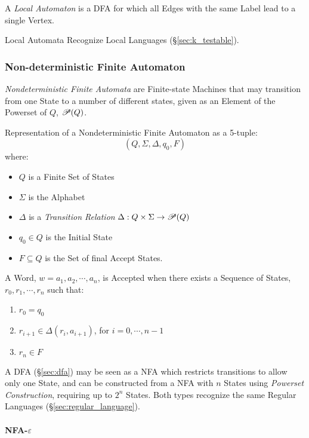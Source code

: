 A \emph{Local Automaton} is a DFA for which all Edges with the same
Label lead to a single Vertex.

Local Automata Recognize Local Languages (\S\ref{sec:k_testable}).



\subsubsection{Non-deterministic Finite Automaton}\label{sec:ndfa}

\emph{Nondeterministic Finite Automata} are Finite-state Machines that
may transition from one State to a number of different states, given
as an Element of the Powerset of $Q$, $\mathscr{P}(Q)$.

Representation of a Nondeterministic Finite Automaton as a
5-tuple:
\[
  (Q,\Sigma,\Delta,q_0,F)
\]
where:
\begin{itemize}
  \item $Q$ is a Finite Set of States
  \item $\Sigma$ is the Alphabet
  \item $\Delta$ is a \emph{Transition Relation} $\Delta: Q \times
    \Sigma \rightarrow \mathscr{P}(Q)$
  \item $q_0 \in Q$ is the Initial State
  \item $F \subseteq Q$ is the Set of final Accept States.
\end{itemize}

A Word, $w=a_1,a_2,\cdots,a_n$, is Accepted when there exists a
Sequence of States, $r_0,r_1,\cdots,r_n$ such that:
\begin{enumerate}
  \item $r_0 = q_0$
  \item $r_{i+1} \in \Delta(r_i, a_{i+1})$, for $i = 0, \cdots, n-1$
  \item $r_n \in F$
\end{enumerate}

A DFA (\S\ref{sec:dfa}) may be seen as a NFA which restricts
transitions to allow only one State, and can be constructed from a NFA
with $n$ States using \emph{Powerset Construction}, requiring up to
$2^n$ States. Both types recognize the same Regular Languages
(\S\ref{sec:regular_language}).



\paragraph{NFA-$\varepsilon$}\label{sec:nfa_e}\hfill

